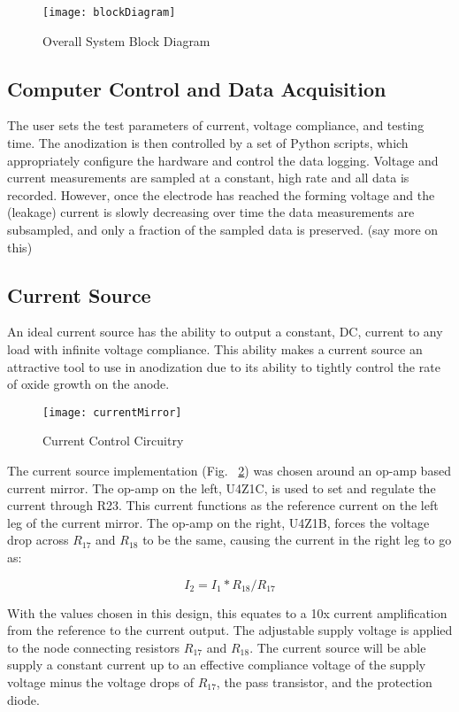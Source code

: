 
\begin{figure}[here]
\centering
\texttt{[image: blockDiagram]}
\caption{Overall System Block Diagram}
\label{fig:blockDiagram}
\end{figure}

\subsection{Computer Control and Data Acquisition}

The user sets the test parameters of current, voltage compliance, and testing time. The anodization is then controlled by a set of Python scripts, which appropriately configure the hardware and control the data logging. Voltage and current measurements are sampled at a constant, high rate and all data is recorded. However, once the electrode has reached the forming voltage and the (leakage) current is slowly decreasing over time the data measurements are subsampled, and only a fraction of the sampled data is preserved.  (say more on this)

\subsection{Current Source}

An ideal current source has the ability to output a constant, DC, current to any load with infinite voltage compliance. This ability makes a current source an attractive tool to use in anodization due to its ability to tightly control the rate of oxide growth on the anode.

\begin{figure}[here]
\centering
\texttt{[image: currentMirror]}
\caption{Current Control Circuitry}
\label{fig:currentMirror}
\end{figure}


The current source implementation (Fig. ~\ref{fig:currentMirror}) was chosen around an op-amp based current mirror. The op-amp on the left, U4Z1C, is used to set and regulate the current through R23. This current functions as the reference current on the left leg of the current mirror. The op-amp on the right, U4Z1B, forces the voltage drop across $R_{17}$ and $R_{18}$ to be the same, causing the current in the right leg to go as:

\begin{equation}
I_2 = I_1*R_{18}/R_{17}
\end{equation}

With the values chosen in this design, this equates to a 10x current amplification from the reference to the current output. The adjustable supply voltage is applied to the node connecting resistors $R_{17}$ and $R_{18}$. The current source will be able supply a constant current up to an effective compliance voltage of the supply voltage minus the voltage drops of $R_{17}$, the pass transistor, and the protection diode.

